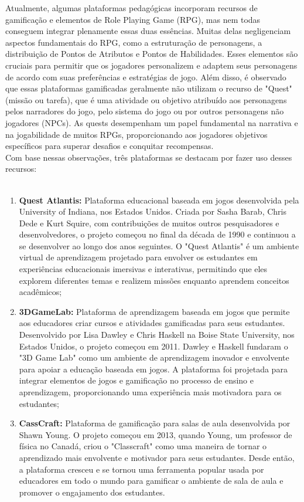 Atualmente, algumas plataformas pedagógicas incorporam recursos de gamificação e elementos de Role Playing Game (RPG), mas nem todas conseguem integrar plenamente essas duas essências. Muitas delas negligenciam aspectos fundamentais do RPG, como a estruturação de personagens, a distribuição de Pontos de Atributos e Pontos de Habilidades. Esses elementos são cruciais para permitir que os jogadores personalizem e adaptem seus personagens de acordo com suas preferências e estratégias de jogo. Além disso, é observado que essas plataformas gamificadas geralmente não utilizam o recurso de "Quest" (missão ou tarefa), que é uma atividade ou objetivo atribuído aos personagens pelos narradores do jogo, pelo sistema do jogo ou por outros personagens não jogadores (NPCs). As quests desempenham um papel fundamental na narrativa e na jogabilidade de muitos RPGs, proporcionando aos jogadores objetivos específicos para superar desafios e conquitar recompensas.
\\

Com base nessas observações, três plataformas se destacam por fazer uso desses recursos:
\\

\\
\begin{enumerate}
    \item \textbf{Quest Atlantis:} Plataforma educacional baseada em jogos desenvolvida pela University of Indiana, nos Estados Unidos. Criada por Sasha Barab, Chris Dede e Kurt Squire, com contribuições de muitos outros pesquisadores e desenvolvedores, o projeto começou no final da década de 1990 e continuou a se desenvolver ao longo dos anos seguintes. O "Quest Atlantis" é um ambiente virtual de aprendizagem projetado para envolver os estudantes em experiências educacionais imersivas e interativas, permitindo que eles explorem diferentes temas e realizem missões enquanto aprendem conceitos acadêmicos;  
\\ 
\item \textbf{3DGameLab:} Plataforma de aprendizagem baseada em jogos que permite aos educadores criar cursos e atividades gamificadas para seus estudantes. Desenvolvido por Lisa Dawley e Chris Haskell na Boise State University, nos Estados Unidos, o projeto começou em 2011. Dawley e Haskell fundaram o "3D Game Lab" como um ambiente de aprendizagem inovador e envolvente para apoiar a educação baseada em jogos. A plataforma foi projetada para integrar elementos de jogos e gamificação no processo de ensino e aprendizagem, proporcionando uma experiência mais motivadora para os estudantes;
\\
\item \textbf{CassCraft:} Plataforma de gamificação para salas de aula desenvolvida por Shawn Young. O projeto começou em 2013, quando Young, um professor de física no Canadá, criou o "Classcraft" como uma maneira de tornar o aprendizado mais envolvente e motivador para seus estudantes. Desde então, a plataforma cresceu e se tornou uma ferramenta popular usada por educadores em todo o mundo para gamificar o ambiente de sala de aula e promover o engajamento dos estudantes. 
\\
\end{enumerate}

